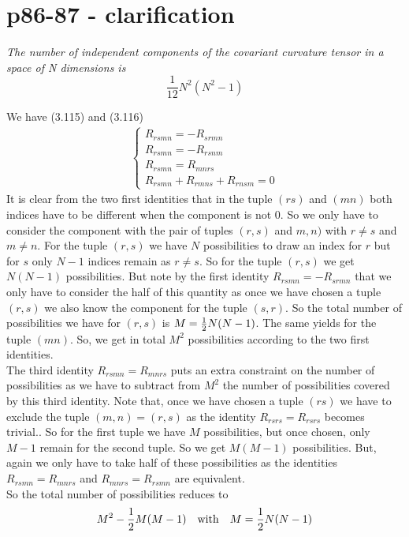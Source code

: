 \section{p86-87 - clarification}
\begin{tcolorbox}
\textit{The number of independent components of the covariant curvature tensor in a space of N dimensions is} $$\frac{1}{12}N^2\left(N^2-1\right)$$
\end{tcolorbox}
We have (3.115) and (3.116)
\begin{align}
\left \{ \begin{array}{l}
R_{rsmn} =  - R_{srmn}\\
R_{rsmn} =  - R_{rsnm}\\
R_{rsmn} =   R_{mnrs}\\
R_{rsmn} + R_{rmns}+R_{rnsm}=0
\end{array}\right.
\end{align}
It is clear from the two first identities that  in the tuple $(rs)$ and $(mn)$ both indices have to be different when the component is not $0$. So we only have to consider the component with the pair of tuples $(r,s)$ and $m,n)$ with $r \neq s$ and $m \neq n$.
For the tuple $(r,s)$ we have $N$ possibilities to draw an index for $r$ but for $s$ only $N-1$ indices remain as $r \neq s$. So for the tuple $(r,s)$ we get $N(N-1)$ possibilities. But note by the first identity $R_{rsmn} =  - R_{srmn}$ that we only have to consider the half of this quantity as once we have chosen a tuple $(r,s)$ we also know  the component for the tuple $(s,r)$. So the total number of possibilities we have for  $(r,s)$ is $M = \frac{1}{2} N(N-1)$. The same yields for the tuple $(mn)$. So, we get in total $M^2$ possibilities according to the two first identities.\\
The third identity $R_{rsmn} =   R_{mnrs}$ puts an extra constraint on the number of possibilities as we have to subtract from $M^2$ the number of possibilities covered by this third identity. Note that, once we have chosen a tuple $(rs)$ we have to exclude the tuple $(m,n) =  (r,s)$ as the identity $R_{rsrs} =   R_{rsrs}$ becomes trivial.. So for the first tuple we have $M$ possibilities, but once chosen, only $M-1$ remain for the second tuple. So we get $M(M-1)$ possibilities. But, again we only have to take half of these possibilities as the identities $R_{rsmn} =   R_{mnrs}$ and $ R_{mnrs} = R_{rsmn}$ are equivalent.\\
So the total number of possibilities reduces to $$ M^2 - \frac{1}{2} M(M-1) \quad \text{with} \quad M=\frac{1}{2} N(N-1) $$
